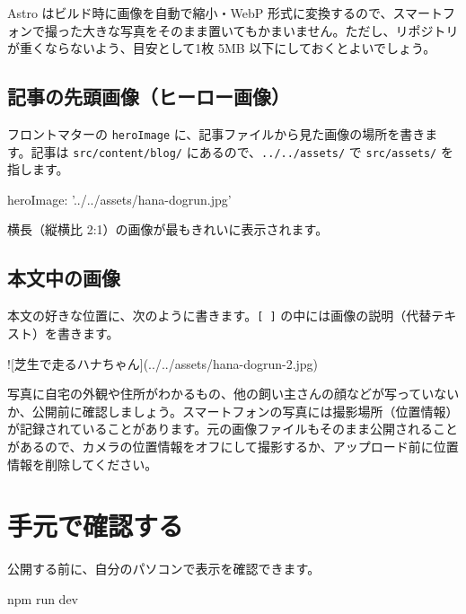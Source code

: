 \documentclass[a4paper,11pt]{ltjsarticle}
\newcommand{\file}[1]{\texttt{#1}}
\begin{document}
Astro はビルド時に画像を自動で縮小・WebP 形式に変換するので、スマートフォンで撮った大きな写真をそのまま置いてもかまいません。ただし、リポジトリが重くならないよう、目安として1枚 5MB 以下にしておくとよいでしょう。

\subsection{記事の先頭画像（ヒーロー画像）}

フロントマターの \file{heroImage} に、記事ファイルから見た画像の場所を書きます。記事は \file{src/content/blog/} にあるので、\file{../../assets/} で \file{src/assets/} を指します。

\begin{code}
heroImage: '../../assets/hana-dogrun.jpg'
\end{code}

横長（縦横比 2:1）の画像が最もきれいに表示されます。

\subsection{本文中の画像}

本文の好きな位置に、次のように書きます。\file{[ ]} の中には画像の説明（代替テキスト）を書きます。

\begin{code}
![芝生で走るハナちゃん](../../assets/hana-dogrun-2.jpg)
\end{code}

\begin{hint}[プライバシーへの配慮]
写真に自宅の外観や住所がわかるもの、他の飼い主さんの顔などが写っていないか、公開前に確認しましょう。スマートフォンの写真には撮影場所（位置情報）が記録されていることがあります。元の画像ファイルもそのまま公開されることがあるので、カメラの位置情報をオフにして撮影するか、アップロード前に位置情報を削除してください。
\end{hint}

\section{手元で確認する}\label{sec:local}

公開する前に、自分のパソコンで表示を確認できます。

\begin{code}
npm run dev
\end{code}
\end{document}
